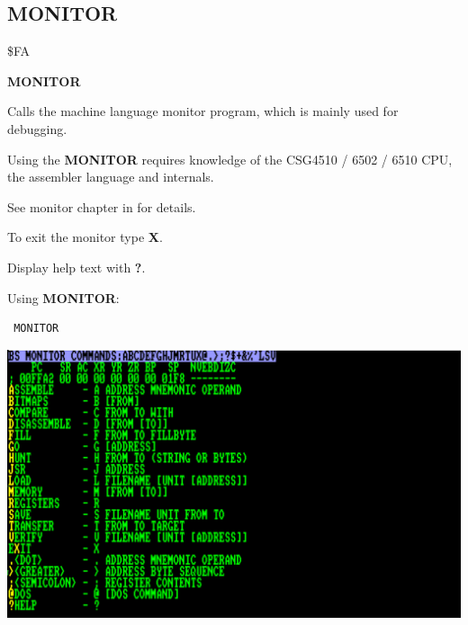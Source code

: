 
\newpage
\subsection{MONITOR}
\begin{description}[leftmargin=2cm,style=nextline]
\item [Token:] \$FA
\item [Format:] {\bf MONITOR}
\item [Usage:]  Calls the machine language
                monitor program, which is mainly used for
                debugging.

\item [Remarks:] Using the {\bf MONITOR} requires knowledge
                 of the CSG4510 / 6502 / 6510 CPU,
                 the assembler language and internals.

                 See monitor chapter in
                  for details.

                 To exit the monitor type {\bf X}.

                 Display help text with {\bf ?}.

\item [Example:] Using {\bf MONITOR}:
\begin{tcolorbox}[colback=black,coltext=white]
\verbatimfont{\codefont}
\begin{verbatim}
 MONITOR
\end{verbatim}
\end{tcolorbox}
\end{description}
\begin{center}
\includegraphics[width=0.8\linewidth]{images/monitor-h.png}
\end{center}


